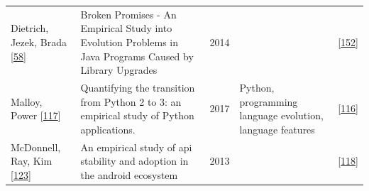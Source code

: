\documentclass[]{book}
\begin{document}
\begin{longtable}[]{@{}lllll@{}}
\begin{minipage}[t]{0.12\columnwidth}\raggedright\strut
Dietrich, Jezek, Brada
{[}\protect\hyperlink{ref-Dietrich2014}{58}{]}\strut
\end{minipage} & \begin{minipage}[t]{0.31\columnwidth}\raggedright\strut
Broken Promises - An Empirical Study into Evolution Problems in Java
Programs Caused by Library Upgrades\strut
\end{minipage} & \begin{minipage}[t]{0.02\columnwidth}\raggedright\strut
2014\strut
\end{minipage} & \begin{minipage}[t]{0.24\columnwidth}\raggedright\strut
\strut
\end{minipage} & \begin{minipage}[t]{0.16\columnwidth}\raggedright\strut
{[}\protect\hyperlink{ref-Raemaekers2017}{152}{]}\strut
\end{minipage}\tabularnewline
\begin{minipage}[t]{0.12\columnwidth}\raggedright\strut
Malloy, Power {[}\protect\hyperlink{ref-Malloy2017}{117}{]}\strut
\end{minipage} & \begin{minipage}[t]{0.31\columnwidth}\raggedright\strut
Quantifying the transition from Python 2 to 3: an empirical study of
Python applications.\strut
\end{minipage} & \begin{minipage}[t]{0.02\columnwidth}\raggedright\strut
2017\strut
\end{minipage} & \begin{minipage}[t]{0.24\columnwidth}\raggedright\strut
Python, programming language evolution, language features\strut
\end{minipage} & \begin{minipage}[t]{0.16\columnwidth}\raggedright\strut
{[}\protect\hyperlink{ref-Malloy2018}{116}{]}\strut
\end{minipage}\tabularnewline
\begin{minipage}[t]{0.12\columnwidth}\raggedright\strut
McDonnell, Ray, Kim
{[}\protect\hyperlink{ref-McDonnell2013}{123}{]}\strut
\end{minipage} & \begin{minipage}[t]{0.31\columnwidth}\raggedright\strut
An empirical study of api stability and adoption in the android
ecosystem\strut
\end{minipage} & \begin{minipage}[t]{0.02\columnwidth}\raggedright\strut
2013\strut
\end{minipage} & \begin{minipage}[t]{0.24\columnwidth}\raggedright\strut
\strut
\end{minipage} & \begin{minipage}[t]{0.16\columnwidth}\raggedright\strut
{[}\protect\hyperlink{ref-Manikas2016}{118}{]}\strut
\end{minipage}\tabularnewline
\bottomrule
\end{longtable}
\end{document}

